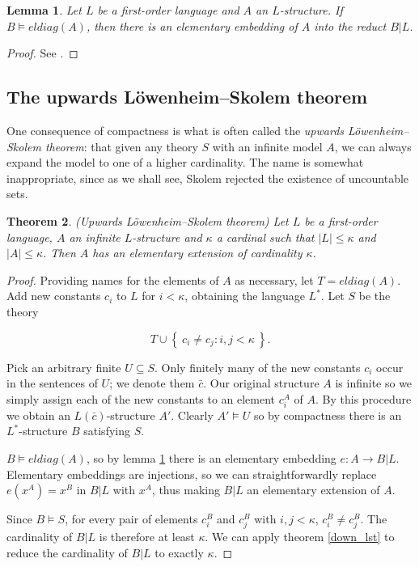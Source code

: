 \documentclass[10pt, a4paper, oneside]{article}
\newtheorem{thm}{Theorem}[section]
\theoremstyle{definition}
\theoremstyle{remark}
\theoremstyle{plain}
\newtheorem{lem}[thm]{Lemma}
\theoremstyle{plain}
\begin{document}
\begin{lem}
    \label{eldiag_lem}
    Let $L$ be a first-order language and $A$ an $L$-structure. If $B \models
    eldiag(A)$, then there is an elementary embedding of $A$ into the reduct
    $B | L$.
\end{lem}

\begin{proof}
    See \citealt[p. 49]{hodges1997}.
\end{proof}

\subsection{The upwards Löwenheim--Skolem theorem}

One consequence of compactness is what is often called the \emph{upwards
Löwenheim--Skolem theorem}: that given any theory $S$ with an infinite model
$A$, we can always expand the model to one of a higher cardinality. The name is
somewhat inappropriate, since as we shall see, Skolem rejected the existence of
uncountable sets.

\begin{thm}
    \label{up_lst}
    (Upwards Löwenheim--Skolem theorem)
    Let $L$ be a first-order language, $A$ an infinite $L$-structure and
    $\kappa$ a cardinal such that $|L| \leq \kappa$ and $|A| \leq \kappa$. Then
    $A$ has an elementary extension of cardinality $\kappa$.
\end{thm}

\begin{proof}
    Providing names for the elements of $A$ as necessary, let $T = eldiag(A)$.
    Add new constants $c_i$ to $L$ for $i < \kappa$, obtaining the language
    $L^*$. Let $S$ be the theory
    
    \begin{displaymath}
        T \cup \left\{\ c_i \neq c_j : i, j < \kappa\ \right\}.
    \end{displaymath}
    
    Pick an arbitrary finite $U \subseteq S$. Only finitely many of the new
    constants $c_i$ occur in the sentences of $U$; we denote them $\bar{c}$. Our
    original structure $A$ is infinite so we simply assign each of the new
    constants to an element $c^A_i$ of $A$. By this procedure we obtain an
    $L(\bar{c})$-structure $A'$. Clearly $A' \models U$ so by compactness there
    is an $L^*$-structure $B$ satisfying $S$.
    
    $B \models eldiag(A)$, so by lemma \ref{eldiag_lem} there is an elementary
    embedding $e : A \rightarrow B | L$. Elementary embeddings are injections,
    so we can straightforwardly replace $e(x^A) = x^B$ in $B | L$ with $x^A$,
    thus making $B | L$ an elementary extension of $A$.
    
    Since $B \models S$, for every pair of elements $c^B_i$ and $c^B_j$ with
    $i, j < \kappa$, $c^B_i \neq c^B_j$. The cardinality of $B | L$ is therefore
    at least $\kappa$. We can apply theorem \ref{down_lst} to reduce the
    cardinality of $B | L$ to exactly $\kappa$.
\end{proof}
\end{document}

